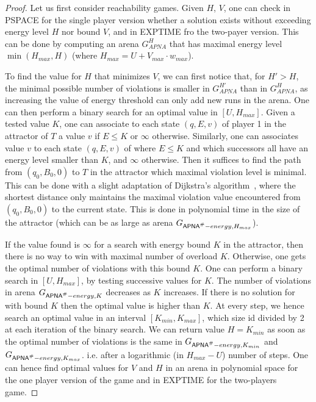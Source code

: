 \begin{proof}
 Let us first consider \LVenergynb  reachability games.
Given $H$, $V$, one can check in PSPACE for the single player version whether a solution exists without exceeding energy level $H$ nor bound $V$, and in EXPTIME fro the two-payer version. This can be done by computing an arena $G^{H}_{APNA}$ that has 
maximal energy level $\min(H_{max},H)$ (where $H_{max} = U+V_{max} \cdot w_{max}$).

To find the value for $H$ that minimizes $V$, we can first notice that, for $H'>H$, the minimal possible number of violations is smaller in $G^{H'}_{APNA}$ than in $G^{H}_{APNA}$, as increasing the value of energy threshold can only add new runs in the arena. 
One can then perform a binary search for an optimal value in $[U,H_{max}]$. Given a tested value $K$, one can associate to each state $(q,E,v)$ of player 1 in the attractor of $T$ a value $v$ if $E\leq K$ or $\infty$ otherwise. Similarly, one can associates value $v$ to each state $(q,E,v)$ of  where $E\leq K$ and which successors all have an energy level smaller than $K$, and $\infty$ otherwise. 
%
Then it suffices to find the path from $(q_0,B_0,0)$ to $T$ in the attractor which maximal violation level is minimal. 
This can be done with a slight adaptation of Dijkstra's algorithm~\cite{Dijkstra59}, where the shortest distance only maintains the maximal violation value encountered from $(q_0,B_0,0)$ to the current state. This is done in polynomial time in the size of the attractor (which can be as large as arena $G_{\textsf{APNA\textsuperscript{$\#$}}-energy,H_{max}}$). 

If the value found is $\infty$ for a search with energy bound $K$ in the attractor, then there is no way to win \LVenergynb with maximal number of overload $K$. Otherwise, one gets the optimal number of violations with this bound $K$. One can perform a binary search in $[U,H_{max}]$, by testing successive values for $K$. The number of violations in arena $G_{\textsf{APNA\textsuperscript{$\#$}}-energy,K}$ decreases as $K$ increases.
If there is no solution for \LVenergynb with bound $K$ then the optimal value is higher than $K$. At every step, we hence search an optimal value in an interval $[K_{min}, K_{max}]$, which size id divided by 2 at each iteration of the binary search. We can return value $H=K_{min}$ as soon as the optimal number of violations is the same in $G_{\textsf{APNA\textsuperscript{$\#$}}-energy,K_{min}}$ and $G_{\textsf{APNA\textsuperscript{$\#$}}-energy,K_{max}}$.
i.e. after a logarithmic (in $H_{max}-U$) number of steps.
One can hence find optimal values for $V$ and $H$ in an arena in polynomial space for the one player version of the game and in EXPTIME for the two-players game.
\vskip 0.5cm


\end{proof}
